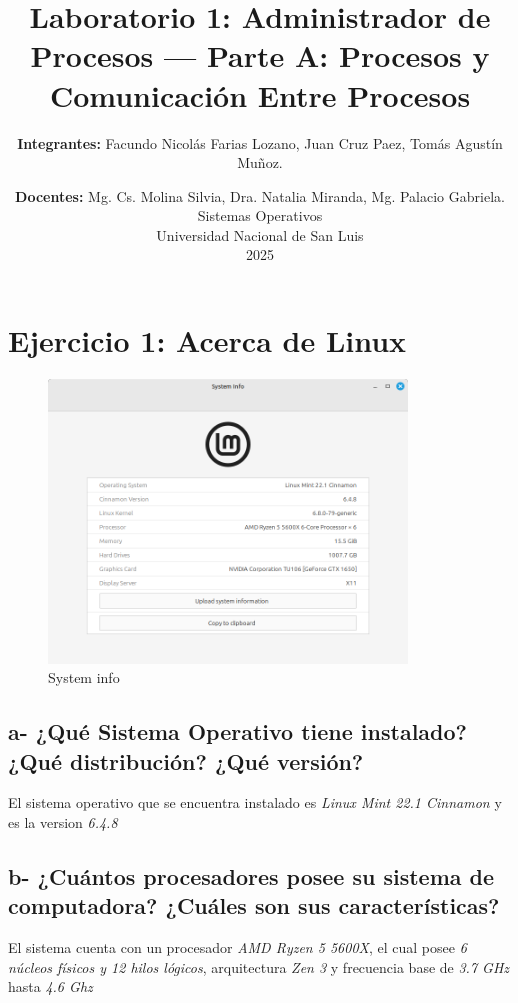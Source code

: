 \documentclass{article}
\title{\textbf{Laboratorio 1: }Administrador de Procesos --- Parte A\@: Procesos y Comunicación Entre Procesos}
\author{ \textbf{Integrantes: }
Facundo Nicolás Farias Lozano,
Juan Cruz Paez,
Tomás Agustín Muñoz.
}
\date{\textbf{Docentes: } 
Mg. Cs. Molina Silvia, Dra. Natalia Miranda, Mg. Palacio Gabriela.\\
  \vspace{0.3cm}
  Sistemas Operativos\\ 
  \vspace{0.2cm}
  Universidad Nacional de San Luis\\
  \vspace{0.2cm}
  2025
  }
\begin{document}
\maketitle


\section*{Ejercicio 1: Acerca de Linux}

\begin{figure}[h]
  \centering
  \includegraphics[width=0.85\textwidth]{resources/ej1a.png}
  \caption{System info}
\end{figure}

\subsection*{a- ¿Qué Sistema Operativo tiene instalado? ¿Qué distribución? ¿Qué versión?}
\noindent
El sistema operativo que se encuentra instalado es \textit{Linux Mint 22.1 Cinnamon} y es la version \textit{6.4.8}

\subsection*{b- ¿Cuántos procesadores posee su sistema de computadora? ¿Cuáles son sus características?}
\noindent
El sistema cuenta con un procesador \textit{AMD Ryzen 5 5600X}, el cual posee \textit{6 núcleos físicos y 12 hilos 
lógicos}, arquitectura \textit{Zen 3} y frecuencia base de \textit{3.7 GHz} hasta \textit{4.6 Ghz}
\end{document}
